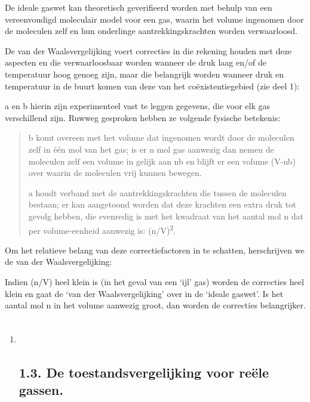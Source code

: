 \documentclass[]{article}
\begin{document}
De ideale gaswet kan theoretisch geverifieerd worden met behulp van een
vereenvoudigd moleculair model voor een gas, waarin het volume ingenomen
door de moleculen zelf en hun onderlinge aantrekkingskrachten worden
verwaarloosd.

De van der Waalsvergelijking voert correcties in die rekening houden met
deze aspecten en die verwaarloosbaar worden wanneer de druk laag en/of
de temperatuur hoog genoeg zijn, maar die belangrijk worden wanneer druk
en temperatuur in de buurt komen van deze van het coëxistentiegebied
(zie deel 1):

a en b hierin zijn experimenteel vast te leggen gegevens, die voor elk
gas verschillend zijn. Ruwweg gesproken hebben ze volgende fysische
betekenis:

\begin{quote}
b komt overeen met het volume dat ingenomen wordt door de moleculen zelf
in één mol van het gas; is er n mol gas aanwezig dan nemen de moleculen
zelf een volume in gelijk aan nb en blijft er een volume (V-nb) over
waarin de moleculen vrij kunnen bewegen.

a houdt verband met de aantrekkingskrachten die tussen de moleculen
bestaan; er kan aangetoond worden dat deze krachten een extra druk tot
gevolg hebben, die evenredig is met het kwadraat van het aantal mol n
dat per volume-eenheid aanwezig is: (n/V)\textsuperscript{2}.
\end{quote}

Om het relatieve belang van deze correctiefactoren in te schatten,
herschrijven we de van der Waalsvergelijking:

Indien (n/V) heel klein is (in het geval van een `ijl' gas) worden de
correcties heel klein en gaat de `van der Waalsvergelijking' over in de
`ideale gaswet'. Is het aantal mol n in het volume aanwezig groot, dan
worden de correcties belangrijker.

\begin{enumerate}
\item
  \subsection{\\}\label{section-1}

  \subsection{}\label{section-2}

  \subsection{1.3. De toestandsvergelijking voor reële
  gassen.}\label{de-toestandsvergelijking-voor-reuxeble-gassen.}
\end{enumerate}
\end{document}
